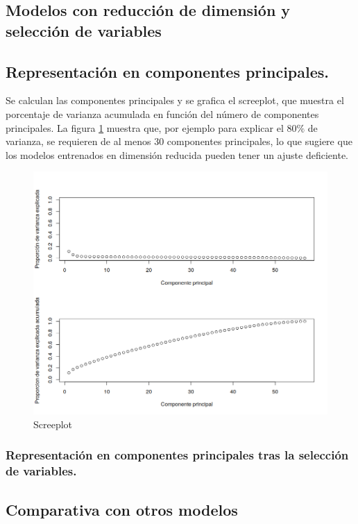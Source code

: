 \documentclass[12pt, letterpaper]{article}
\begin{document}
\subsection{Modelos con reducción de dimensión y selección de variables}

\subsection{Representación en componentes principales.}

Se calculan las componentes principales y se grafica el screeplot, que muestra el porcentaje de varianza acumulada en función del número de componentes principales. La figura \ref{screeplot} muestra que, por ejemplo para explicar el $80\%$ de varianza, se requieren de al menos $30$ componentes principales, 
lo que sugiere que los modelos entrenados en dimensión reducida pueden tener un ajuste deficiente.

\begin{figure}[h]
\centering
	\includegraphics[scale=.5]{images/pca.png} 
	\caption{Screeplot}
		\label{screeplot}
\end{figure}


\subsubsection{Representación en componentes principales tras la selección de variables.}


\subsection{Comparativa con otros modelos}
\end{document}
